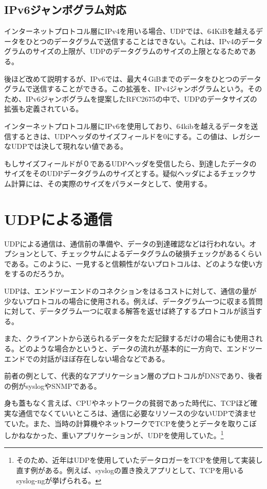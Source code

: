 \subsection{IPv6ジャンボグラム対応}
インターネットプロトコル層にIPv4を用いる場合、UDPでは、64KiBを越えるデータをひとつのデータグラムで送信することはできない。これは、IPv4のデータグラムのサイズの上限が、UDPのデータグラムのサイズの上限となるためである。

後ほど改めて説明するが、IPv6では、最大４GiBまでのデータをひとつのデータグラムで送信することができる。この拡張を、IPv4ジャンボグラムという。そのため、IPv6ジャンボグラムを提案したRFC2675の中で、UDPのデータサイズの拡張も定義されている。

インターネットプロトコル層にIPv6を使用しており、64kibを越えるデータを送信するときは、UDPヘッダのサイズフィールドを0にする。この値は、レガシーなUDPでは決して現れない値である。

もしサイズフィールドが０であるUDPヘッダを受信したら、到達したデータのサイズをそのUDPデータグラムのサイズとする。疑似ヘッダによるチェックサム計算には、その実際のサイズをパラメータとして、使用する。

\section{UDPによる通信}

UDPによる通信は、通信前の準備や、データの到達確認などは行われない。オプションとして、チェックサムによるデータグラムの破損チェックがあるくらいである。このように、一見すると信頼性がないプロトコルは、どのような使い方をするのだろうか。

UDPは、エンドツーエンドのコネクションをはるコストに対して、通信の量が少ないプロトコルの場合に使用される。例えば、データグラム一つに収まる質問に対して、データグラム一つに収まる解答を返せば終了するプロトコルが該当する。

また、クライアントから送られるデータをただ記録するだけの場合にも使用される。どのような場合かというと、データの流れが基本的に一方向で、エンドツーエンドでの対話がほぼ存在しない場合などである。

前者の例として、代表的なアプリケーション層のプロトコルがDNSであり、後者の例がsyslogやSNMPである。

身も蓋もなく言えば、CPUやネットワークの貧弱であった時代に、TCPほど確実な通信でなくていいところは、通信に必要なリソースの少ないUDPで済ませていた。また、当時の計算機やネットワークでTCPを使うとデータを取りこぼしかねなかった、重いアプリケーションが、UDPを使用していた。\footnote{そのため、近年はUDPを使用していたデータロガーをTCPを使用して実装し直す例がある。例えば、syslogの置き換えアプリとして、TCPを用いるsyslog-ngが挙げられる。}


